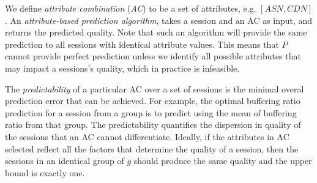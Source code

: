 We define {\it attribute combination} ({\it AC}) to be a set of attributes, e.g. $[ASN, CDN]$. An {\it attribute-based prediction algorithm}, takes a session and an AC as input, and returns the predicted quality.  Note that such an algorithm will provide the same prediction to all sessions with identical attribute values. This means that $P$ cannot provide perfect prediction unless we identify all possible attributes that may impact a sessions's quality, which in practice is infeasible.

The {\it predictability} of a particular AC over a set of sessions is the minimal overal prediction error that can be achieved.
For example, the optimal buffering ratio prediction for a session from a group is to predict using the mean of buffering ratio from that group. The predictability quantifies the dispersion in quality of the sessions that an AC cannot differentiate. Ideally, if the attributes in AC selected reflect all the factors that determine the quality of a session, then the sessions in an identical group of $g$ should produce the same quality and the upper bound is exactly one. 




